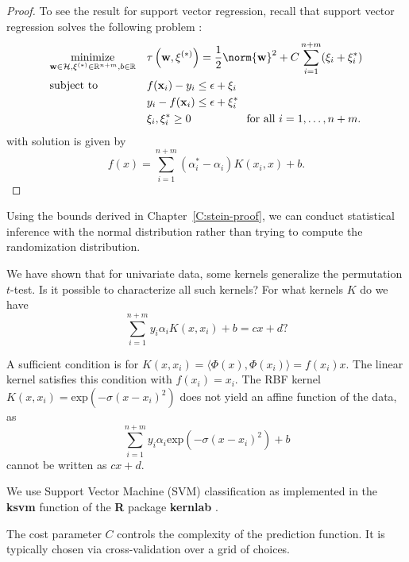 \begin{proof}
  To see the result for support vector regression,
  recall that support vector regression solves the following problem
  \cite{scholkopf2002learning}:
  \begin{equation*}
    \begin{aligned}
      & \underset{\mathbf{w}\in\mathcal{H},\mathbf{\xi}^{(*)}\in\mathbb{R}^{n+m},b\in\mathbb{R}}{\text{minimize}}
      & &\tau \left ( \mathbf{w},\mathbf{\xi}^{(*)} \right ) =\frac{1}{2}\norm{\mathbf{w}}^2+C\sum_{i=1}^{n+m}(\xi_i+\xi_i^*) \\
      & \text{subject to}
      & & f(\mathbf{x}_i)-y_i \leq \epsilon +\xi_i\\
      &&& y_i-f(\mathbf{x}_i) \leq \epsilon+\xi_i^* \\
      &&& \xi_i,\xi_i^*\geq0 \qquad \qquad \quad \text{for all } i=1,\ldots,n+m.
    \end{aligned}
  \end{equation*}
  with solution is given by
  \begin{equation*}
    f(x)=\sum_{i=1}^{n+m}(\alpha_i^*-\alpha_i)K(x_i,x)+b.
  \end{equation*}
\end{proof}

Using the bounds derived in Chapter~\ref{C:stein-proof}, we can
conduct statistical inference with the normal distribution rather than
trying to compute the randomization distribution.

We have shown that for univariate data, some kernels generalize the
permutation $t$-test.  Is it possible to characterize all such kernels?
For what kernels $K$ do we have
\begin{equation}
\sum_{i=1}^{n+m} y_i \alpha_i K(x, x_i) + b = cx + d?
\end{equation}

A sufficient condition is for $K(x, x_i) = \langle \Phi(x), \Phi(x_i) \rangle =
f(x_i) x$.  The linear kernel satisfies this condition with $f(x_i) =
x_i$.  The RBF kernel $K(x, x_i) = \text{exp}(-\sigma (x-x_i)^2)$ does
not yield an affine function of the data, as
\begin{equation}
\sum_{i=1}^{n+m} y_i \alpha_i \text{exp}(-\sigma (x-x_i)^2) + b
\end{equation}
cannot be written as $cx + d$.

We use Support Vector Machine (SVM) classification
as implemented in the {\bf ksvm} function of the {\bf R}
\cite{cran} package {\bf kernlab} \cite{kernlab}.

The cost parameter $C$ controls the complexity of the prediction
function. It is typically chosen via cross-validation over a grid
of choices.

